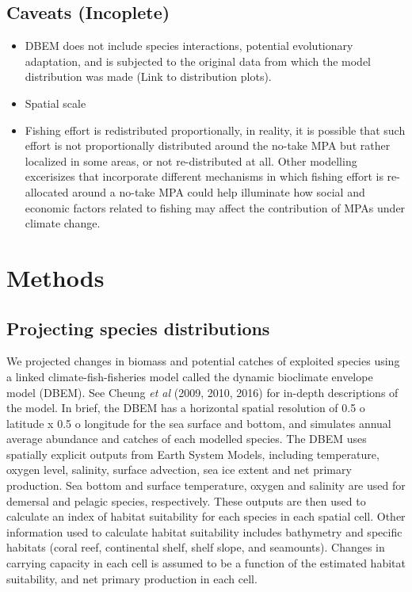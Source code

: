 \documentclass[
]{article}
\providecommand{\tightlist}{%
  \setlength{\itemsep}{0pt}\setlength{\parskip}{0pt}}
\begin{document}
\hypertarget{caveats-incoplete}{%
\subsection{Caveats (Incoplete)}\label{caveats-incoplete}}

\begin{itemize}
\tightlist
\item
  DBEM does not include species interactions, potential evolutionary adaptation, and is subjected to the original data from which the model distribution was made (Link to distribution plots).
\item
  Spatial scale
\item
  Fishing effort is redistributed proportionally, in reality, it is possible that such effort is not proportionally distributed around the no-take MPA but rather localized in some areas, or not re-distributed at all. Other modelling excerisizes that incorporate different mechanisms in which fishing effort is re-allocated around a no-take MPA could help illuminate how social and economic factors related to fishing may affect the contribution of MPAs under climate change.
\end{itemize}

\hypertarget{methods-1}{%
\section{Methods}\label{methods-1}}

\hypertarget{projecting-species-distributions-1}{%
\subsection{Projecting species distributions}\label{projecting-species-distributions-1}}

We projected changes in biomass and potential catches of exploited species using a linked climate-fish-fisheries model called the dynamic bioclimate envelope model (DBEM). See Cheung \emph{et al }(2009, 2010, 2016) for in-depth descriptions of the model. In brief, the DBEM has a horizontal spatial resolution of 0.5 o latitude x 0.5 o longitude for the sea surface and bottom, and simulates annual average abundance and catches of each modelled species. The DBEM uses spatially explicit outputs from Earth System Models, including temperature, oxygen level, salinity, surface advection, sea ice extent and net primary production. Sea bottom and surface temperature, oxygen and salinity are used for demersal and pelagic species, respectively. These outputs are then used to calculate an index of habitat suitability for each species in each spatial cell. Other information used to calculate habitat suitability includes bathymetry and specific habitats (coral reef, continental shelf, shelf slope, and seamounts). Changes in carrying capacity in each cell is assumed to be a function of the estimated habitat suitability, and net primary production in each cell.
\end{document}
